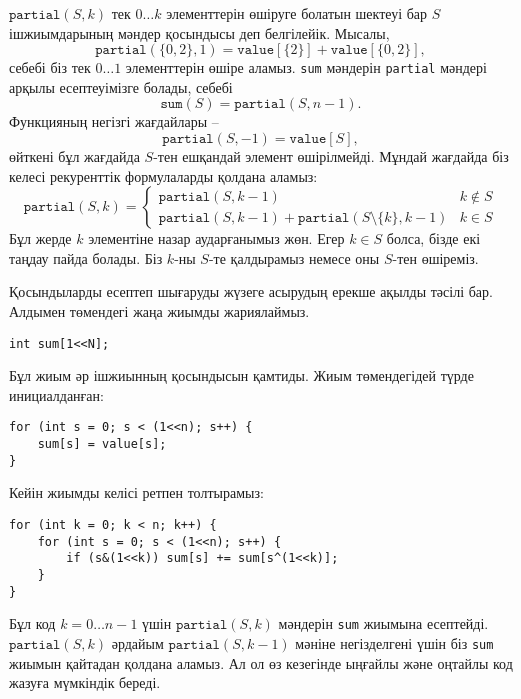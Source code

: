 $\texttt{partial}(S,k)$ тек $0 \ldots k$ элементтерін 
өшіруге болатын шектеуі бар $S$ ішжиымдарының
мәндер қосындысы деп белгілейік. 
Мысалы,
\[\texttt{partial}(\{0,2\},1)=\texttt{value}[\{2\}]+\texttt{value}[\{0,2\}],\]
себебі біз тек $0 \ldots 1$ элементтерін өшіре аламыз. 
\texttt{sum} мәндерін \texttt{partial} мәндері арқылы 
есептеуімізге болады, себебі 
\[\texttt{sum}(S) = \texttt{partial}(S,n-1).\]
Функцияның негізгі жағдайлары --
\[\texttt{partial}(S,-1)=\texttt{value}[S],\]
өйткені бұл жағдайда $S$-тен ешқандай элемент өшірілмейді. 
Мұндай жағдайда біз келесі рекуренттік формулаларды қолдана аламыз:
\begin{equation*}
    \texttt{partial}(S,k) = \begin{cases}
               \texttt{partial}(S,k-1) & k \notin S \\
               \texttt{partial}(S,k-1) + \texttt{partial}(S \setminus \{k\},k-1) & k \in S
           \end{cases}
\end{equation*}
Бұл жерде $k$ элементіне назар аударғанымыз жөн.
Егер $k \in S$ болса, бізде екі таңдау пайда болады. Біз $k$-ны $S$-те
қалдырамыз немесе оны $S$-тен өшіреміз.

Қосындыларды есептеп шығаруды жүзеге 
асырудың ерекше ақылды тәсілі бар. Алдымен 
төмендегі жаңа жиымды жариялаймыз.
\begin{lstlisting}
int sum[1<<N];
\end{lstlisting}
Бұл жиым әр ішжиынның қосындысын қамтиды.
Жиым төмендегідей түрде инициалданған:
\begin{lstlisting}
for (int s = 0; s < (1<<n); s++) {
    sum[s] = value[s];
}
\end{lstlisting}
Кейін жиымды келісі ретпен толтырамыз:
\begin{lstlisting}
for (int k = 0; k < n; k++) {
    for (int s = 0; s < (1<<n); s++) {
        if (s&(1<<k)) sum[s] += sum[s^(1<<k)];
    }
}
\end{lstlisting}
Бұл код $k=0 \ldots n-1$ үшін $\texttt{partial}(S,k)$ мәндерін 
\texttt{sum} жиымына есептейді. $\texttt{partial}(S,k)$ әрдайым
$\texttt{partial}(S,k-1)$ мәніне негізделгені үшін біз 
\texttt{sum} жиымын қайтадан қолдана аламыз. Ал ол өз кезегінде
ыңғайлы және оңтайлы код жазуға мүмкіндік береді.

